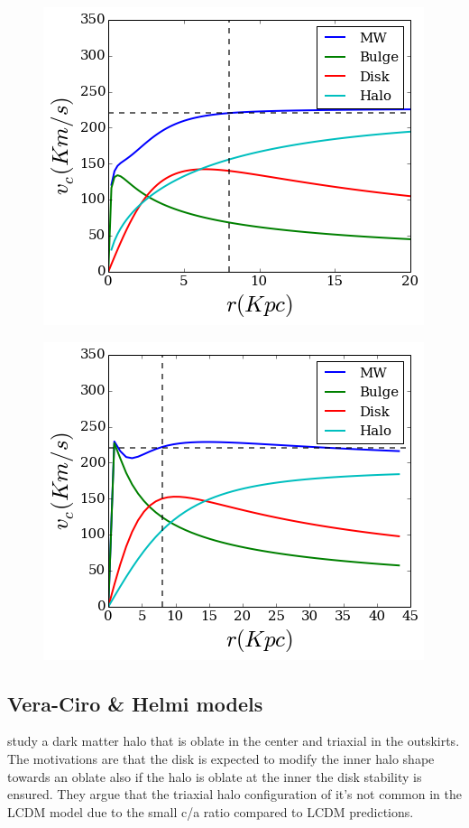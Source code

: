 \begin{figure}[H]\label{MWBesla07}
\centering
\includegraphics[scale=0.7]{../figures/MWBEsla07.png}
\end{figure}



\begin{figure}[H]\label{MWLM10}
\centering
\includegraphics[scale=0.7]{../figures/MWLM10.png}
\end{figure}

\subsection{Vera-Ciro \& Helmi models}

\citep{Vera13} study a dark matter halo that is oblate in the center
 and triaxial in the outskirts. The motivations  are that the disk is expected
 to modify the inner halo shape towards an oblate also if the 
halo is oblate at the inner the disk stability is ensured. They 
argue that the triaxial halo configuration of \citep{Law10} it's 
not common in the LCDM model due to the small c/a ratio compared to 
LCDM predictions.   

